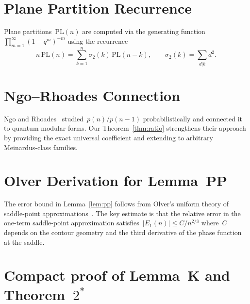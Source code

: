 \documentclass[11pt,a4paper]{article}
\begin{document}
\appendix
\section{Plane Partition Recurrence}\label{app:pp_recurrence}

Plane partitions~$\mathrm{PL}(n)$ are computed via the generating function~$\prod_{m=1}^{\infty}(1-q^m)^{-m}$ using the recurrence
\[
  n\,\mathrm{PL}(n) = \sum_{k=1}^{n}\sigma_2(k)\,\mathrm{PL}(n-k),
  \qquad \sigma_2(k) = \sum_{d|k} d^2.
\]

\section{Ngo--Rhoades Connection}\label{app:ngo_rhoades}

Ngo and Rhoades~\cite{ngo2017} studied~$p(n)/p(n-1)$ probabilistically and connected it to quantum modular forms. Our Theorem~\ref{thm:ratio} strengthens their approach by providing the exact universal coefficient and extending to arbitrary Meinardus-class families.

\section{Olver Derivation for Lemma~PP}\label{app:olver}

The error bound in Lemma~\ref{lem:pp} follows from Olver's uniform theory of saddle-point approximations~\cite{olver1974}. The key estimate is that the relative error in the one-term saddle-point approximation satisfies~$|E_1(n)| \leq C/n^{2/3}$ where~$C$ depends on the contour geometry and the third derivative of the phase function at the saddle.

\section{Compact proof of Lemma~K and Theorem~\texorpdfstring{$2^*$}{2*}}\label{app:lemmaKcompact}
\end{document}
